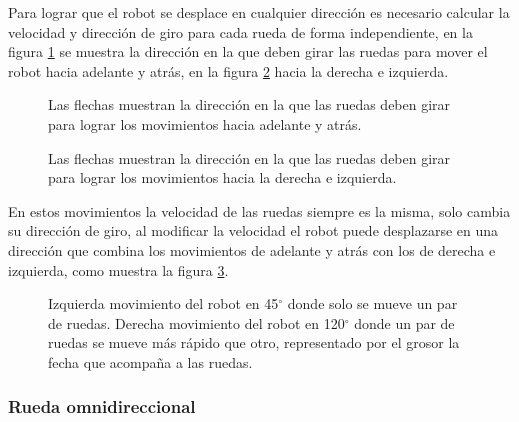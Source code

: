 \documentclass{iccmemoria}
\begin{document}
Para lograr que el robot se desplace en cualquier dirección es necesario calcular la velocidad y dirección de giro para cada rueda de forma independiente, en la figura \ref{fig:omni_movement_up_down} se muestra la dirección en la que deben girar las ruedas para mover el robot hacia adelante y atrás, en la figura \ref{fig:omni_movement_left_right} hacia la derecha e izquierda.

\begin{figure}[H]
  \centering
  \begin{footnotesize}
  
  \end{footnotesize}
  \caption{Las flechas muestran la dirección en la que las ruedas deben girar para lograr los movimientos hacia adelante y atrás.}
  \label{fig:omni_movement_up_down}
\end{figure}

\begin{figure}[H]
  \centering
  \begin{footnotesize}
  
  \end{footnotesize}
  \caption{Las flechas muestran la dirección en la que las ruedas deben girar para lograr los movimientos hacia la derecha e izquierda.}
  \label{fig:omni_movement_left_right}
\end{figure}

En estos movimientos la velocidad de las ruedas siempre es la misma, solo cambia su dirección de giro, al modificar la velocidad el robot puede desplazarse en una dirección que combina los movimientos de adelante y atrás con los de derecha e izquierda, como muestra la figura \ref{fig:omni_movement_combined}.

\begin{figure}[H]
  \centering
  \begin{footnotesize}
  
  \end{footnotesize}
  \caption{Izquierda movimiento del robot en 45$^{\circ}$ donde solo se mueve un par de ruedas. Derecha movimiento del robot en 120$^{\circ}$ donde un par de ruedas se mueve más rápido que otro, representado por el grosor la fecha que acompaña a las ruedas.}
  \label{fig:omni_movement_combined}
\end{figure}

\subsubsection{Rueda omnidireccional}
\end{document}
